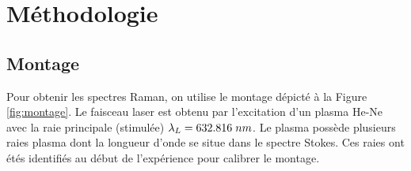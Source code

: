 \documentclass[10pt,letterpaper,twocolumn]{article}
\newcommand{\s}{\hspace{0.1cm}}
\begin{document}
\section{Méthodologie}\label{sec:metho} %

\subsection{Montage}
Pour obtenir les spectres Raman, on utilise le montage dépicté à la Figure \ref{fig:montage}. Le faisceau laser est obtenu par l'excitation d'un plasma He-Ne avec la raie principale (stimulée) ${\lambda_L = 632.816\s nm}$. Le plasma possède plusieurs raies plasma dont la longueur d'onde se situe dans le spectre Stokes. Ces raies ont étés identifiés au début de l'expérience pour calibrer le montage. \par
\end{document}
